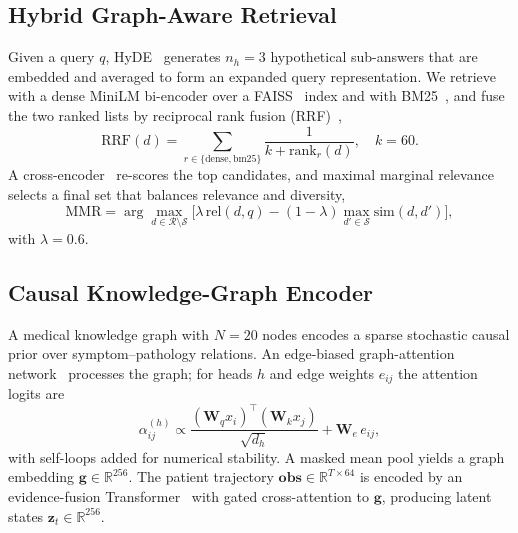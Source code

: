 \documentclass[conference]{IEEEtran}
\newcommand{\zt}{\mathbf{z}_t}
\begin{document}
\subsection{Hybrid Graph-Aware Retrieval}
Given a query $q$, HyDE~\cite{gao2023hyde} generates $n_h{=}3$ hypothetical
sub-answers that are embedded and averaged to form an expanded query
representation. We retrieve with a dense MiniLM bi-encoder over a
FAISS~\cite{johnson2019faiss} index and with BM25~\cite{robertson2009bm25},
and fuse the two ranked lists by reciprocal rank fusion
(RRF)~\cite{cormack2009rrf},
\begin{equation}
\mathrm{RRF}(d)=\sum_{r\in\{\text{dense},\text{bm25}\}}\frac{1}{k+\mathrm{rank}_r(d)},
\quad k=60 .
\end{equation}
A cross-encoder~\cite{nogueira2019passage} re-scores the top candidates, and
maximal marginal relevance~\cite{carbonell1998mmr} selects a final set that
balances relevance and diversity,
\begin{equation}
\mathrm{MMR}=\arg\max_{d\in\mathcal{R}\setminus\mathcal{S}}
\big[\lambda\,\mathrm{rel}(d,q)-(1{-}\lambda)\max_{d'\in\mathcal{S}}\mathrm{sim}(d,d')\big],
\end{equation}
with $\lambda{=}0.6$.

\subsection{Causal Knowledge-Graph Encoder}
A medical knowledge graph with $N{=}20$ nodes encodes a sparse stochastic
causal prior over symptom--pathology relations. An edge-biased
graph-attention network~\cite{velickovic2018gat} processes the graph; for
heads $h$ and edge weights $e_{ij}$ the attention logits are
\begin{equation}
\alpha_{ij}^{(h)}\propto\frac{(\mathbf{W}_q x_i)^\top(\mathbf{W}_k x_j)}{\sqrt{d_h}}
+ \mathbf{W}_e\, e_{ij},
\end{equation}
with self-loops added for numerical stability. A masked mean pool yields a
graph embedding $\mathbf{g}\in\mathbb{R}^{256}$. The patient trajectory
$\mathbf{obs}\in\mathbb{R}^{T\times64}$ is encoded by an evidence-fusion
Transformer~\cite{vaswani2017attention} with gated cross-attention to
$\mathbf{g}$, producing latent states $\zt\in\mathbb{R}^{256}$.
\end{document}
